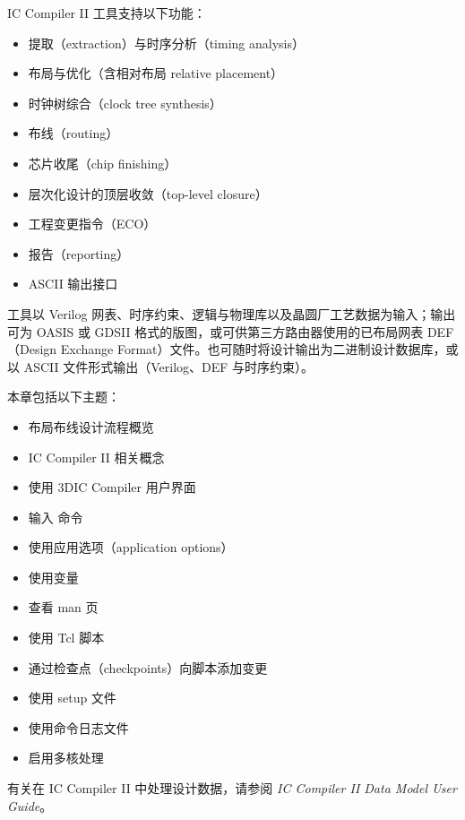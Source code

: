 \label{chap:icc2}

IC Compiler II 工具支持以下功能：
\begin{itemize}
  \item 提取（extraction）与时序分析（timing analysis）
  \item 布局与优化（含相对布局 relative placement）
  \item 时钟树综合（clock tree synthesis）
  \item 布线（routing）
  \item 芯片收尾（chip finishing）
  \item 层次化设计的顶层收敛（top-level closure）
  \item 工程变更指令（ECO）
  \item 报告（reporting）
  \item ASCII 输出接口
\end{itemize}

工具以 Verilog 网表、时序约束、逻辑与物理库以及晶圆厂工艺数据为输入；输出可为 OASIS 或 GDSII 格式的版图，或可供第三方路由器使用的已布局网表 DEF（Design Exchange Format）文件。也可随时将设计输出为二进制设计数据库，或以 ASCII 文件形式输出（Verilog、DEF 与时序约束）。

本章包括以下主题：
\begin{itemize}
  \item 布局布线设计流程概览
  \item IC Compiler II 相关概念
  \item 使用 3DIC Compiler 用户界面
  \item 输入  命令
  \item 使用应用选项（application options）
  \item 使用变量
  \item 查看 man 页
  \item 使用 Tcl 脚本
  \item 通过检查点（checkpoints）向脚本添加变更
  \item 使用 setup 文件
  \item 使用命令日志文件
  \item 启用多核处理
\end{itemize}

\begin{seeAlsoBox}
有关在 IC Compiler II 中处理设计数据，请参阅 \textit{IC Compiler II Data Model User Guide}。
\end{seeAlsoBox}


